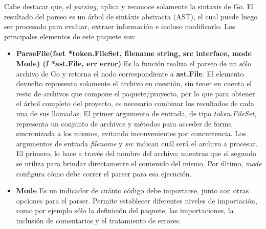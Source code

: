 \begin{itemize}
  Cabe destacar que, el \textit{parsing}, aplica y reconoce solamente la sintaxis de Go.
  El resultado del parseo es un árbol de sintáxis abstracta (AST), el cual puede luego ser procesado 
  para evaluar, extraer información e incluso modificarlo.
  Los principales elementos de este paquete son:
  \begin{itemize}
    \item \textbf{ParseFile(fset *token.FileSet, filename string, src interface{}, mode Mode) (f *ast.File, err error)} 
    Es la función realiza el parseo de un sólo archivo de Go y retorna el nodo correspondiente a \textbf{ast.File}.
    El elemento devuelto representa solamente el archivo en cuestión, sin tener en cuenta el resto de 
    archivos que compone el paquete/proyecto, por lo que para obtener el árbol completo del proyecto, 
    es necesario combinar los resultados de cada una de sus llamadas.
    El primer argumento de entrada, de tipo \textit{token.FileSet}, representa un conjunto de archivos 
    y métodos para acceder de forma sincronizada a los mismos, evitando inconvenientes por concurrencia.
    Los argumentos de entrada \textit{filename} y \textit{src} indican cuál será el archivo a procesar.
    El primero, lo hace a través del nombre del archivo; mientras que el segundo se utiliza para brindar 
    directamente el contenido del mismo.
    Por último, \textit{mode} configura cómo debe correr el parser para esa ejecución.
    \item \textbf{Mode} Es un indicador de cuánto código debe importarse, junto con otras opciones para el parser.
    Permite establecer diferentes niveles de importación, como por ejemplo sólo la definición del paquete, 
    las importaciones, la inclusión de comentarios y el tratamiento de errores.
  \end{itemize}
\end{itemize}
